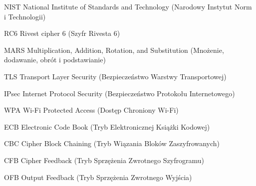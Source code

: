 \begin{abbrev}
\item[NIST] National Institute of Standards and Technology (Narodowy Instytut Norm i Technologii)
\item[RC6] Rivest cipher 6 (Szyfr Rivesta 6)
\item[MARS] Multiplication, Addition, Rotation, and Substitution  (Mnożenie, dodawanie, obrót i podstawianie)
\item[TLS] Transport Layer Security (Bezpieczeństwo Warstwy Transportowej)
\item[IPsec] Internet Protocol Security (Bezpieczeństwo Protokołu Internetowego)
\item[WPA] Wi-Fi Protected Access (Dostęp Chroniony Wi-Fi)
\item[ECB] Electronic Code Book (Tryb Elektronicznej Książki Kodowej)
\item[CBC] Cipher Block Chaining (Tryb Wiązania Bloków Zaszyfrowanych)
\item[CFB] Cipher Feedback (Tryb Sprzężenia Zwrotnego Szyfrogramu)
\item[OFB] Output Feedback (Tryb Sprzężenia Zwrotnego Wyjścia)
\end{abbrev}

